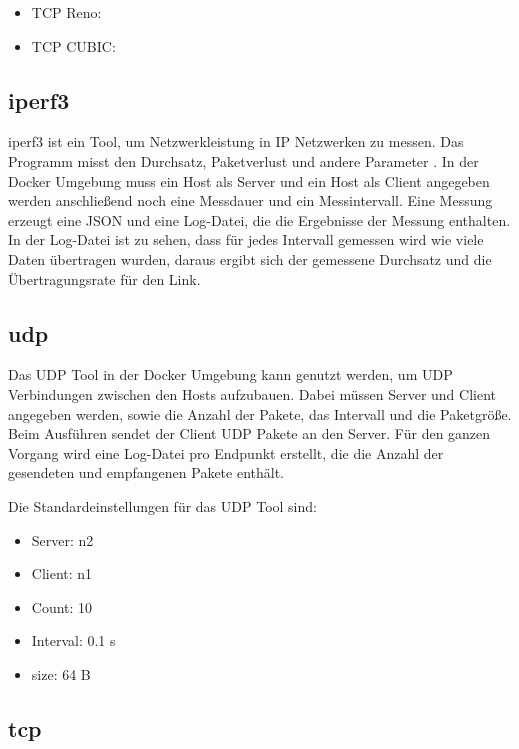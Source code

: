 \begin{itemize}
    \item TCP Reno: \cite{tcp_newreno}
    \item TCP CUBIC: \cite{tcp_cubic}
\end{itemize}

\subsection{iperf3}
\label{sec:iperf3_docker_tool}

iperf3 ist ein Tool, um Netzwerkleistung in IP Netzwerken zu messen.
Das Programm misst den Durchsatz, Paketverlust und andere Parameter \cite{iperf3}.
In der Docker Umgebung muss ein Host als Server und ein Host als Client angegeben werden anschließend noch eine Messdauer und ein Messintervall.
Eine Messung erzeugt eine JSON und eine Log-Datei, die die Ergebnisse der Messung enthalten.
In der Log-Datei ist zu sehen, dass für jedes Intervall gemessen wird wie viele Daten übertragen wurden, daraus ergibt sich der gemessene Durchsatz und die Übertragungsrate für den Link.

\subsection{udp}
\label{sec:udp_docker_tool}

Das UDP Tool in der Docker Umgebung kann genutzt werden, um UDP Verbindungen zwischen den Hosts aufzubauen.
Dabei müssen Server und Client angegeben werden, sowie die Anzahl der Pakete, das Intervall und die Paketgröße.
Beim Ausführen sendet der Client UDP Pakete an den Server. Für den ganzen Vorgang wird eine Log-Datei pro Endpunkt erstellt, die die Anzahl der gesendeten und empfangenen Pakete enthält.

Die Standardeinstellungen für das UDP Tool sind:
\begin{itemize}[noitemsep]
    \item Server: n2
    \item Client: n1
    \item Count: 10
    \item Interval: 0.1 s
    \item size: 64 B
\end{itemize}

\subsection{tcp}
\label{sec:tcp_docker_tool}

